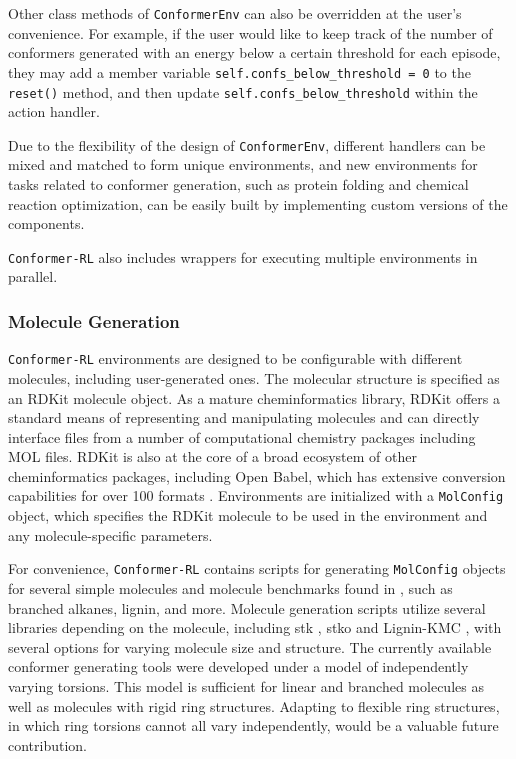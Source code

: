 \documentclass[twoside,11pt]{article}
\newcommand{\code}[1]{\texttt{#1}}
\newcommand{\titleofpaper}{Conformer-RL}
\begin{document}
Other class methods of \code{ConformerEnv} can also be overridden at the user's convenience. For example, if the user would like to keep track of the number of conformers generated with an energy below a certain threshold for each episode, they may add a member variable \code{self.confs\_below\_threshold = 0} to the \code{reset()} method, and then update \code{self.confs\_below\_threshold} within the action handler.

Due to the flexibility of the design of \code{ConformerEnv}, different handlers can be mixed and matched to form unique environments, and new environments for tasks related to conformer generation, such as protein folding and chemical reaction optimization, can be easily built by implementing custom versions of the components.

\code{\titleofpaper} also includes wrappers for executing multiple environments in parallel. 

  \subsubsection{Molecule Generation}
  \code{\titleofpaper} environments are designed to be configurable with different molecules, including user-generated ones. The molecular structure is specified as an RDKit molecule object. As a mature cheminformatics library, RDKit offers a standard means of representing and manipulating molecules and can directly interface files from a number of computational chemistry packages including MOL files. RDKit is also at the core of a broad ecosystem of other cheminformatics packages, including Open Babel, which has extensive conversion capabilities for over 100 formats \citep{Oboyle2011openbabel}. Environments are initialized with a \code{MolConfig} object, which specifies the RDKit molecule to be used in the environment and any molecule-specific parameters.

  For convenience, \code{\titleofpaper} contains scripts for generating \code{MolConfig} objects for several simple molecules and molecule benchmarks found in \citet{gogineni2020torsionnet}, such as branched alkanes, lignin, and more. Molecule generation scripts utilize several libraries depending on the molecule, including stk \citep{Turcani2021stk}, stko \citep{Tarzia2021stko} and Lignin-KMC \citep{Orella2019ligninkmc}, with several options for varying molecule size and structure. The currently available conformer generating tools were developed under a model of independently varying torsions. This model is sufficient for linear and branched molecules as well as molecules with rigid ring structures. Adapting to flexible ring structures, in which ring torsions cannot all vary independently, would be a valuable future contribution.
  
\end{document}
